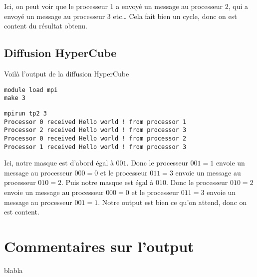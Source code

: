 \documentclass[11pt]{article}
\begin{document}
Ici, on peut voir que le processeur 1 a envoyé un message au processeur 2, qui a envoyé un message au processeur 3 etc\ldots{} Cela fait bien un cycle, donc on est content du résultat obtenu.

\subsection{Diffusion HyperCube}
\label{sec:orgce60e70}

Voilà l'output de la diffusion HyperCube
\begin{verbatim}
module load mpi
make 3
\end{verbatim}

\begin{verbatim}
mpirun tp2 3
Processor 0 received Hello world ! from processor 1
Processor 2 received Hello world ! from processor 3
Processor 0 received Hello world ! from processor 2
Processor 1 received Hello world ! from processor 3
\end{verbatim}



Ici, notre masque est d'abord égal à \(001\). Donc le processeur \(001 = 1\) envoie un message au processeur \(000 = 0\) et le processeur \(011 = 3\) envoie un message au processeur \(010 = 2\).
Puis notre masque est égal à \(010\). Donc le processeur \(010 = 2\) envoie un message au processeur \(000 = 0\) et le processeur \(011 = 3\) envoie un message au processeur \(001 = 1\).
Notre output est bien ce qu'on attend, donc on est content.

\section{Commentaires sur l'output}
\label{sec:org717ddf7}
blabla
\end{document}
